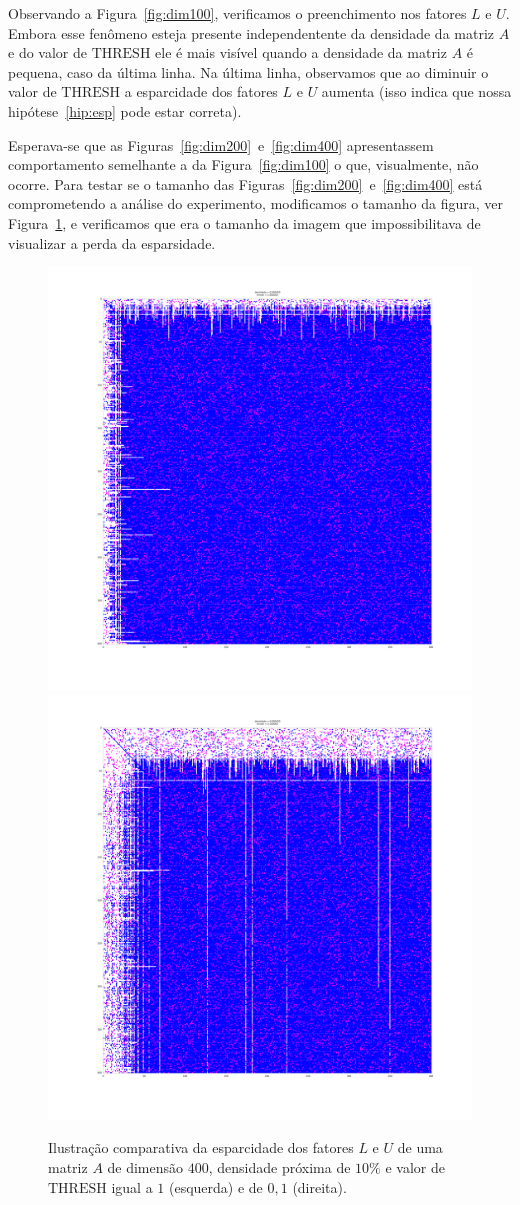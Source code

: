 \documentclass[12pt,a4paper]{article}
\begin{document}
Observando a Figura~\ref{fig:dim100}, verificamos o preenchimento nos fatores
$L$ e $U$. Embora esse fenômeno esteja presente independentente da densidade da
matriz $A$ e do valor de $\mathrm{THRESH}$ ele é mais visível quando a densidade
da matriz $A$ é pequena, caso da última linha. Na última linha, observamos que
ao diminuir o valor de $\mathrm{THRESH}$ a esparcidade dos fatores $L$ e $U$
aumenta (isso indica que nossa hipótese~\ref{hip:esp} pode estar correta).

Esperava-se que as Figuras~\ref{fig:dim200}~e~\ref{fig:dim400} apresentassem
comportamento semelhante a da Figura~\ref{fig:dim100} o que, visualmente, não
ocorre. Para testar se o tamanho das Figuras~\ref{fig:dim200}~e~\ref{fig:dim400}
está comprometendo a análise do experimento, modificamos o tamanho da figura,
ver Figura~\ref{fig:zoom}, e verificamos que era o tamanho da imagem que
impossibilitava de visualizar a perda da esparsidade. 
\begin{figure}[!htb]
    \begin{center}
        \includegraphics[width=.4\textwidth, trim=300 300 250 100,
        clip]{src/zoom400-3-1.png}
        \includegraphics[width=.4\textwidth, trim=300 300 250 100,
        clip]{src/zoom400-3-5.png}
    \end{center}
    \caption{Ilustração comparativa da esparcidade dos fatores $L$ e $U$ de uma
    matriz $A$ de dimensão $400$, densidade próxima de $10\%$ e valor de
    $\mathrm{THRESH}$ igual a $1$ (esquerda) e de $0,1$ (direita).}
    \label{fig:zoom}
\end{figure}
\end{document}
